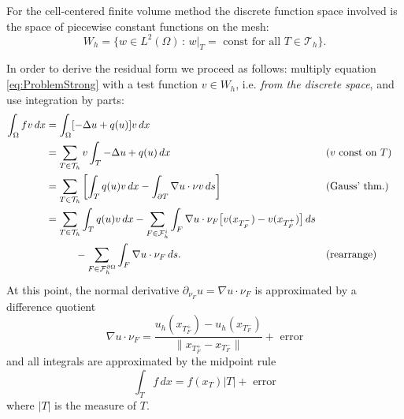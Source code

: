 \documentclass[a4paper,12pt]{article}
\begin{document}
For the cell-centered finite volume method the discrete function space involved
is the space of piecewise constant functions on the mesh:
\begin{equation*}
W_h = \{w\in L^2(\Omega) \,:\,  \text{$w|_T=$ const for all $T\in\mathcal{T}_h$}\} .
\end{equation*}

In order to derive the residual form we proceed as follows: multiply
equation \eqref{eq:ProblemStrong} with a test function $v\in W_h$, i.e. \textit{from
the discrete space}, and use integration by parts:
\begin{align*}
\int_{\Omega} f v \,dx &= \int_{\Omega} [-\Delta u + q(u)] v\,dx\\
&= \sum_{T\in\mathcal{T}_h} v \int_T -\Delta u + q(u) \,dx &&\text{($v$ const on $T$)}\\
&= \sum_{T\in\mathcal{T}_h} \left[\int_T q(u) v \,dx - \int_{\partial T} \nabla u \cdot \nu v \,ds
\right] &&\text{(Gauss' thm.)} \\
&= \sum_{T\in\mathcal{T}_h} \int_T q(u) v \,dx
-\sum_{F\in\mathcal{F}_h^i} \int_F \nabla u \cdot \nu_F \bigl[v(x_{T_F^-}) - v(x_{T_F^+})\bigr] \,ds \\
& \hspace{10mm}-\sum_{F\in\mathcal{F}_h^{\partial\Omega}} \int_F \nabla u \cdot \nu_F \,ds .
&&\text{(rearrange)}
\end{align*}
At this point, the normal derivative $\partial_{\nu_F} u = \nabla u\cdot \nu_F$
is approximated by a difference quotient
\begin{equation*}
\nabla u\cdot \nu_F = \frac{u_h(x_{T_F^+})-u_h(x_{T_F^-})}{\|x_{T_F^+} - x_{T_F^-}\|}
 + \text{ error}
\end{equation*}
and all integrals are approximated by the midpoint rule
\begin{equation*}
\int_T f \,dx = f(x_T)|T| + \text{ error}
\end{equation*}
where $|T|$ is the measure of $T$.
\end{document}
